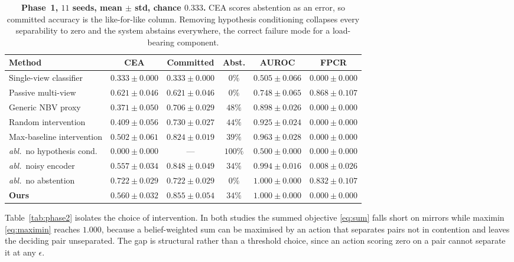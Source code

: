 \begin{table}[t]
\caption{\textbf{Phase~1, $11$ seeds, mean $\pm$ std, chance $0.333$.} CEA scores
abstention as an error, so committed accuracy is the like-for-like column. Removing
hypothesis conditioning collapses every separability to zero and the system
abstains everywhere, the correct failure mode for a load-bearing component.}
\label{tab:phase1}
\begin{center}
\footnotesize
\begin{tabular}{lccccc}
\toprule
\textbf{Method} & \textbf{CEA} & \textbf{Committed} & \textbf{Abst.} &
\textbf{AUROC} & \textbf{FPCR} \\
\midrule
Single-view classifier    & $0.333{\pm}0.000$ & $0.333{\pm}0.000$ & $0\%$  & $0.505{\pm}0.066$ & $0.000{\pm}0.000$ \\
Passive multi-view        & $0.621{\pm}0.046$ & $0.621{\pm}0.046$ & $0\%$  & $0.748{\pm}0.065$ & $0.868{\pm}0.107$ \\
Generic NBV proxy         & $0.371{\pm}0.050$ & $0.706{\pm}0.029$ & $48\%$ & $0.898{\pm}0.026$ & $0.000{\pm}0.000$ \\
Random intervention       & $0.409{\pm}0.056$ & $0.730{\pm}0.027$ & $44\%$ & $0.925{\pm}0.024$ & $0.000{\pm}0.000$ \\
Max-baseline intervention & $0.502{\pm}0.061$ & $0.824{\pm}0.019$ & $39\%$ & $0.963{\pm}0.028$ & $0.000{\pm}0.000$ \\
\midrule
\emph{abl.}\ no hypothesis cond. & $0.000{\pm}0.000$ & --- & $100\%$ & $0.500{\pm}0.000$ & $0.000{\pm}0.000$ \\
\emph{abl.}\ noisy encoder       & $0.557{\pm}0.034$ & $0.848{\pm}0.049$ & $34\%$ & $0.994{\pm}0.016$ & $0.008{\pm}0.026$ \\
\emph{abl.}\ no abstention       & $\mathbf{0.722{\pm}0.029}$ & $0.722{\pm}0.029$ & $0\%$ & $1.000{\pm}0.000$ & $0.832{\pm}0.107$ \\
\textbf{Ours} & $0.560{\pm}0.032$ & $\mathbf{0.855{\pm}0.054}$ & $34\%$ & $1.000{\pm}0.000$ & $\mathbf{0.000{\pm}0.000}$ \\
\bottomrule
\end{tabular}
\end{center}
\end{table}

Table~\ref{tab:phase2} isolates the choice of intervention. In both studies the
summed objective \eqref{eq:sum} falls short on mirrors while maximin
\eqref{eq:maximin} reaches $1.000$, because a belief-weighted sum can be maximised
by an action that separates pairs not in contention and leaves the deciding pair
unseparated. The gap is structural rather than a threshold choice, since an action
scoring zero on a pair cannot separate it at any $\epsilon$.

